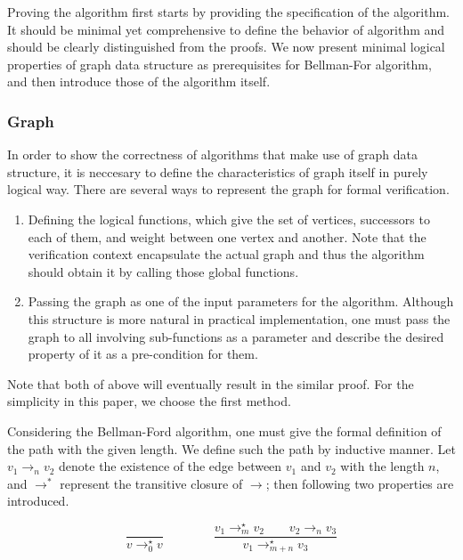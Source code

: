 \documentclass[a4paper,12pt]{article}
\newcommand{\edgen}[3]{#1\rightarrow_{#3}#2}
\newcommand{\pathn}[3]{#1\rightarrow^\star_{#3}#2}
\begin{document}
Proving the algorithm first starts by providing the specification of
the algorithm. It should be minimal yet comprehensive to define the
behavior of algorithm and should be clearly distinguished from the
proofs. We now present minimal logical properties of graph data
structure as prerequisites for Bellman-For algorithm, and then
introduce those of the algorithm itself.
 
\subsubsection{Graph}

In order to show the correctness of algorithms that make use of graph
data structure, it is neccesary to define the characteristics of graph
itself in purely logical way. There are several ways to represent the
graph for formal verification.

\begin{enumerate}

\item Defining the logical functions, which give the set of vertices,
  successors to each of them, and weight between one vertex and
  another. Note that the verification context encapsulate the actual
  graph and thus the algorithm should obtain it by calling those
  global functions.

\item Passing the graph as one of the input parameters for the
  algorithm. Although this structure is more natural in practical
  implementation, one must pass the graph to all involving
  sub-functions as a parameter and describe the desired property of it
  as a pre-condition for them.

\end{enumerate}

Note that both of above will eventually result in the similar
proof. For the simplicity in this paper, we choose the first method.

Considering the Bellman-Ford algorithm, one must give the formal
definition of the path with the given length. We define such the path
by inductive manner. Let $\edgen{v_1}{v_2}{n}$ denote the existence of
the edge between $ v_1 $ and $ v_2 $ with the length $ n $, and $ \to
^* $ represent the transitive closure of $ \to $; then following two
properties are introduced.

\begin{displaymath}
  \frac{}
       {\pathn{v}{v}{0}}
  \qquad\qquad
  \frac{\pathn{v_1}{v_2}{m} \qquad \edgen{v_2}{v_3}{n}}
       {\pathn{v_1}{v_3}{m+n}}
\end{displaymath}
\end{document}
